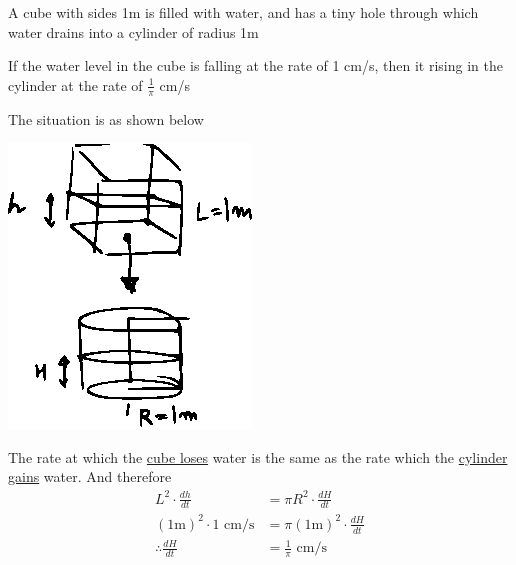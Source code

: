 \documentclass[14pt,fleqn]{extarticle}
\newcommand\cmps{\text{ cm/s}}
\begin{document}
 
\begin{snippet}
    
    \correct
    
    A cube with sides 1m is filled with water, and has a tiny hole through 
    which water drains into a cylinder of radius 1m\newline 
    
    If the water level in the cube is falling at the rate of 1 cm/s, then 
    it rising in the cylinder at the rate of $\frac{1}\pi$ cm/s
    
    \reason
    
    The situation is as shown below 
    \begin{center}
\includegraphics[scale=1.2]{116-A.eps}
\end{center}

The rate at which the \underline{cube loses} water is the same as the rate which 
the \underline{cylinder gains} water. And therefore 
\begin{align}
	L^2\cdot\frac{dh}{dt} &= \pi R^2\cdot \frac{dH}{dt} \\
	\left(1\text{m} \right)^2\cdot 1\cmps &= \pi \left(1\text{m} \right)^2\cdot\frac{dH}{dt} \\
	\therefore \frac{dH}{dt} &= \frac{1}\pi\cmps 
\end{align}
    
\end{snippet} 
\end{document}
